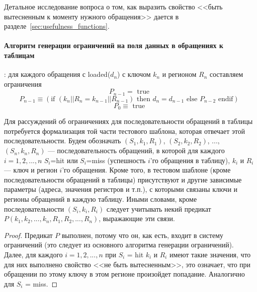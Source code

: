 Детальное исследование вопроса о том, как выразить свойство <<быть вытесненным к
моменту нужного обращения>> дается в разделе~\ref{sec:usefulness_functions}.

\paragraph{Алгоритм генерации ограничений на поля данных в обращениях к таблицам}:
для каждого обращения с loaded($d_n$) с ключом $k_n$ и регионом $R_n$ составляем ограничения
$$P_{n-1} = \mbox{~true}$$
$$P_{n-1} \equiv (\mbox{if~} (k_n||R_n = k_{n-1}||R_{n-1}) \mbox{~then~} d_n =
d_{n-1} \mbox{~else~} P_{n-2} \mbox{~endif})$$
$$P_0 \equiv \mbox{~true}$$

Для рассуждений об ограничениях для последовательности обращений в таблицы потребуется формализация той части тестового шаблона, которая отвечает этой последовательности. Будем обозначать $(S_1, k_1, R_1)$, $(S_2, k_2, R_2)$, ..., $(S_n, k_n, R_n)$ --- последовательность обращений, в которой для каждого $i = 1, 2, ..., n$ $S_i${=}hit или $S_i${=}miss (успешность $i$'го обращения в таблицу), $k_i$ и $R_i$ --- ключ и регион $i$'го обращения. Кроме того, в тестовом шаблоне (кроме последовательности обращений в таблицы) присутствуют и другие зависимые параметры (адреса, значения регистров и т.п.), с которыми связаны ключи и регионы обращений в каждую таблицу. Иными словами, кроме последовательности $(S_i, k_i, R_i)$ следует учитывать некий предикат $P(k_1, k_2, ..., k_n, R_1, R_2, ..., R_n)$, выражающие эти связи.

\begin{theorem}\label{mirror_correctness}
\CorrectnessMirror
\end{theorem}
\begin{proof}
  Предикат $P$ выполнен, потому что он, как есть, входит в систему ограничений (это следует из основного алгоритма генерации ограничений). Далее, для каждого $i = 1, 2, ..., n$ при $S_i$ = hit  $k_i$ и $R_i$ имеют такие значения, что для них выполнено свойство <<не быть вытесненным>>, это означает, что при обращении по этому ключу в этом регионе произойдет попадание. Аналогично для $S_i$ = miss.
\end{proof}

\begin{theorem}\label{mirror_fullness}
\FullnessMirror
\end{theorem}

